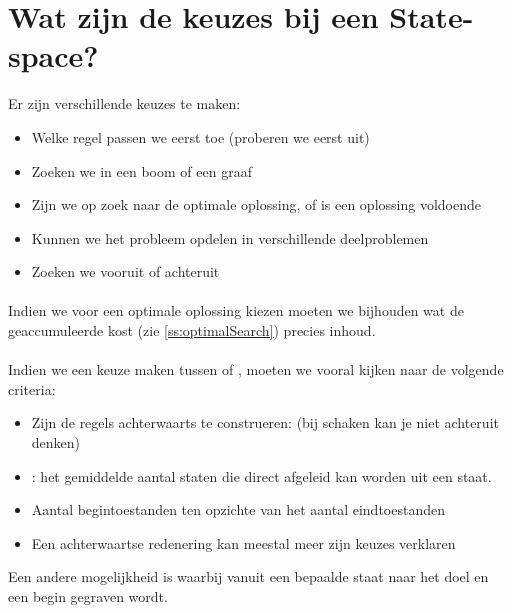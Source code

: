 \section{Wat zijn de keuzes bij een State-space?}
\label{ss:stateSpaceTradeOffs}
Er zijn verschillende keuzes te maken:
\begin{itemize}
 \item Welke regel passen we eerst toe (proberen we eerst uit)
 \item Zoeken we in een boom of een graaf
 \item Zijn we op zoek naar de optimale oplossing, of is een oplossing voldoende
 \item Kunnen we het probleem opdelen in verschillende deelproblemen
 \item Zoeken we vooruit of achteruit
\end{itemize}
\paragraph{}
Indien we voor een optimale oplossing kiezen moeten we bijhouden wat de geaccumuleerde kost (zie \ref{ss:optimalSearch}) precies inhoud.
\paragraph{}
Indien we een keuze maken tussen  of , moeten we vooral kijken naar de volgende criteria:
\begin{itemize}
 \item Zijn de regels achterwaarts te construeren: (bij schaken kan je niet achteruit denken)
 \item {}: het gemiddelde aantal staten die direct afgeleid kan worden uit een staat.
 \item Aantal begintoestanden ten opzichte van het aantal eindtoestanden
 \item Een achterwaartse redenering kan meestal meer zijn keuzes verklaren
\end{itemize}
Een andere mogelijkheid is  waarbij vanuit een bepaalde staat naar het doel en een begin gegraven wordt.
